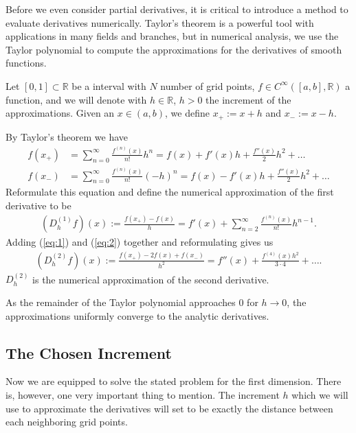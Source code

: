 Before we even consider partial derivatives, it is critical to introduce a method to evaluate derivatives numerically. Taylor's theorem is a powerful tool with applications in many fields and branches, but in numerical analysis, we use the Taylor polynomial to compute the approximations for the derivatives of smooth functions.

Let \([0, 1] \subset \mathbb{R}\) be a interval with \(N\) number of grid points, \(f \in C^{\infty}([a, b], \mathbb{R})\) a function, and we will denote with \(h \in \mathbb{R}\), \(h > 0\) the increment of the approximations. Given an \(x \in (a, b)\), we define \(x_{+} := x + h\) and \(x_{-} := x - h\).

By Taylor's theorem \cite{H.Amann} we have
\begin{align}
    f(x_{+}) &= \sum^{\infty}_{n = 0} \frac{f^{(n)}(x)}{n!} h^n = f(x) + f'(x)h + \frac{f''(x)}{2}h^2 + \dots \label{eq:1}\\
    f(x_{-}) &= \sum^{\infty}_{n = 0} \frac{f^{(n)}(x)}{n!} (-h)^n = f(x) - f'(x)h + \frac{f''(x)}{2}h^2 + \dots \label{eq:2}
\end{align}
Reformulate this equation and define the numerical approximation of the first derivative to be
\begin{align*}
    (D^{(1)}_h f) (x) := \frac{f(x_{+}) - f(x)}{h} = f'(x) + \sum^{\infty}_{n = 2} \frac{f^{(n)} (x)}{n!}h^{n-1} \text{.}
\end{align*}
Adding (\ref{eq:1}) and (\ref{eq:2}) together and reformulating gives us
\begin{align*}
    (D^{(2)}_h f)(x) := \frac{f(x_{+}) - 2f(x) + f(x_{-})}{h^2} = f''(x) + \frac{f^{(4)}(x)h^2}{3 \cdot 4} + \dots \text{.}
\end{align*}
\(D^{(2)}_h\) is the numerical approximation of the second derivative.

As the remainder of the Taylor polynomial approaches \(0\) for \(h \rightarrow 0\), the approximations uniformly converge to the analytic derivatives.

\subsection{The Chosen Increment}

Now we are equipped to solve the stated problem for the first dimension. There is, however, one very important thing to mention. The increment \(h\) which we will use to approximate the derivatives will set to be exactly the distance between each neighboring grid points.
